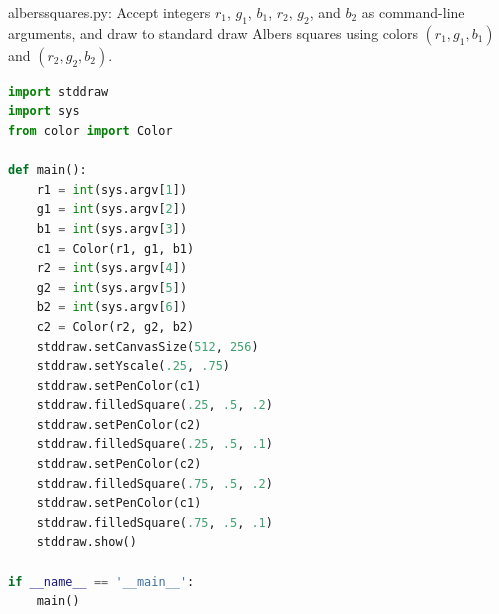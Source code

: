 \documentclass[8pt,a4paper,compress]{beamer}
\begin{document}
\begin{frame}[fragile]
\pause

\begin{framed}
\tiny alberssquares.py: Accept integers $r_1$, $g_1$, $b_1$, $r_2$, $g_2$, and $b_2$ as command-line arguments, and draw to standard draw Albers squares using colors $(r_1, g_1, b_1)$ and $(r_2, g_2, b_2)$.
\end{framed}

\begin{lstlisting}[language=Python]
import stddraw
import sys
from color import Color

def main():
    r1 = int(sys.argv[1])
    g1 = int(sys.argv[2])
    b1 = int(sys.argv[3])
    c1 = Color(r1, g1, b1)
    r2 = int(sys.argv[4])
    g2 = int(sys.argv[5])
    b2 = int(sys.argv[6])
    c2 = Color(r2, g2, b2)
    stddraw.setCanvasSize(512, 256)
    stddraw.setYscale(.25, .75)
    stddraw.setPenColor(c1)
    stddraw.filledSquare(.25, .5, .2)
    stddraw.setPenColor(c2)
    stddraw.filledSquare(.25, .5, .1)
    stddraw.setPenColor(c2)
    stddraw.filledSquare(.75, .5, .2)
    stddraw.setPenColor(c1)
    stddraw.filledSquare(.75, .5, .1)
    stddraw.show()

if __name__ == '__main__':
    main()
\end{lstlisting}
\end{frame}
\end{document}
